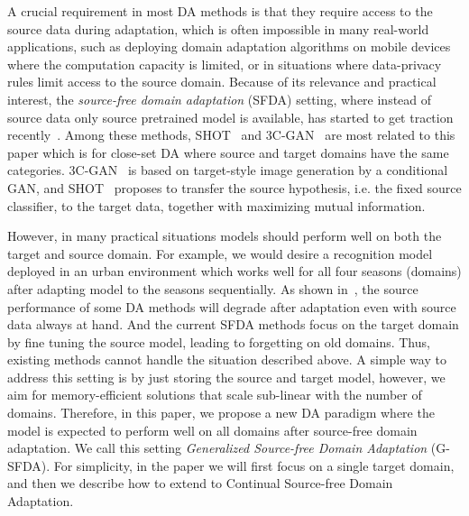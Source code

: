 \documentclass[10pt,twocolumn,letterpaper]{article}
\begin{document}
A crucial requirement in most DA methods is that they require access to the source data during adaptation, which is often impossible in many real-world applications, such as deploying domain adaptation algorithms on mobile devices where the computation capacity is limited, or in situations where data-privacy rules limit access to the source domain. Because of its relevance and practical interest, the \textit{source-free domain adaptation} (SFDA) setting, where instead of source data only source pretrained model is available, has started to get traction recently~\cite{kundu2020universal, kundu2020towards, li2020model, liang2020we,  yang2020unsupervised}. Among these methods, SHOT~\cite{liang2020we} and 3C-GAN~\cite{li2020model} are most related to this paper which is for close-set DA where source and target domains have the same categories. 3C-GAN~\cite{li2020model} is based on target-style image generation by a conditional GAN, and SHOT~\cite{liang2020we} proposes to transfer the source hypothesis, i.e. the fixed source classifier, to the target data, together with maximizing mutual information.

However, in many practical situations models should perform well on both the target and source domain. For example, we would desire a recognition model deployed in an urban environment which works well for all four seasons (domains) after adapting model to the seasons sequentially. As shown in~\cite{ye2020light}, the source performance of some DA methods will degrade after adaptation even with source data always at hand. And the current SFDA methods focus on the target domain by fine tuning the source model, leading to forgetting on old domains. Thus, existing methods cannot handle the situation described above.
{A simple way to address this setting is by just storing the source and target model, however, we aim for memory-efficient solutions that scale sub-linear with the number of domains.} Therefore, in this paper, we propose a new DA paradigm where the model is expected to perform well on all domains after source-free domain adaptation. We call this setting \textit{Generalized Source-free Domain Adaptation} (G-SFDA). For simplicity, in the paper we will first focus on a single target domain, and then we describe how to extend to Continual Source-free Domain Adaptation. 
\end{document}
